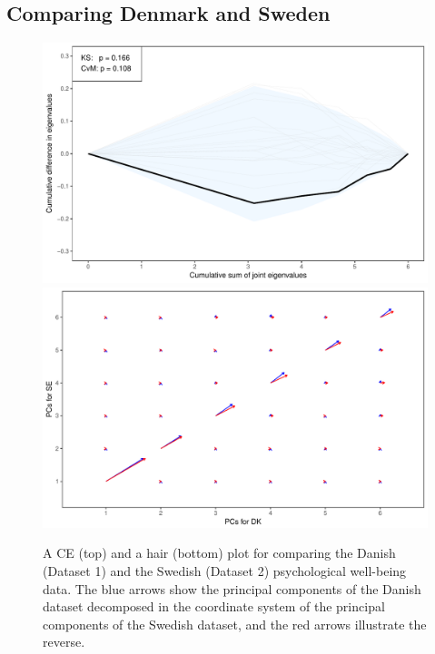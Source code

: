 \documentclass[titlepage,11pt,twoside]{article}
\begin{document}
\subsection{Comparing Denmark and Sweden}
\begin{figure}
\center
\includegraphics[scale = 0.7]{essDKSEce.pdf}
\includegraphics[scale = 0.7]{essDKSEhair.pdf}
\caption{A CE (top) and a hair (bottom) plot for comparing the Danish (Dataset 1) and the Swedish (Dataset 2) psychological well-being data. The blue arrows show the principal components of the Danish dataset decomposed in the coordinate system of the principal components of the Swedish dataset, and the red arrows illustrate the reverse.}
\label{plotSE.cehair}
\end{figure}
\end{document}
